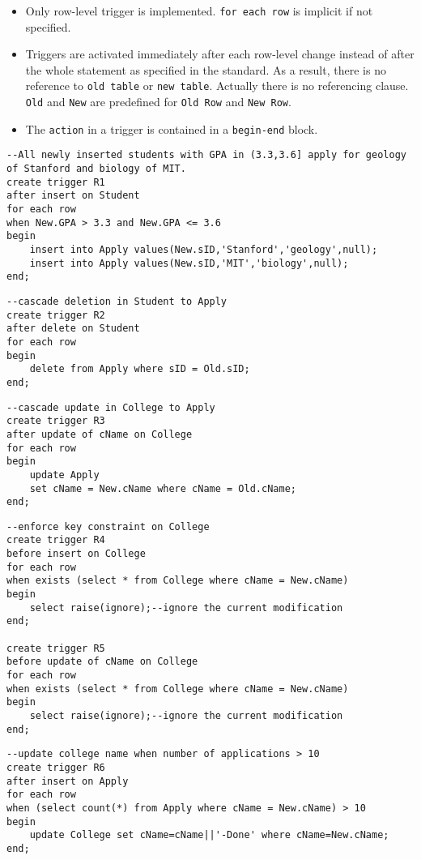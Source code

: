 \begin{itemize}
\item Only row-level trigger is implemented. \texttt{for each row} is implicit if not specified.
\item Triggers are activated immediately after each row-level change instead of after the whole statement as specified in the standard. As a result, there is no reference to \texttt{old table} or \texttt{new table}. Actually there is no referencing clause. \texttt{Old} and \texttt{New} are predefined for \texttt{Old Row} and \texttt{New Row}.
\item The \texttt{action} in a trigger is contained in a \texttt{begin-end} block.
\end{itemize}
\begin{lstlisting}
--All newly inserted students with GPA in (3.3,3.6] apply for geology of Stanford and biology of MIT.
create trigger R1
after insert on Student
for each row
when New.GPA > 3.3 and New.GPA <= 3.6
begin
	insert into Apply values(New.sID,'Stanford','geology',null);
	insert into Apply values(New.sID,'MIT','biology',null);
end;
\end{lstlisting}
\begin{lstlisting}
--cascade deletion in Student to Apply
create trigger R2
after delete on Student
for each row
begin
	delete from Apply where sID = Old.sID;
end;
\end{lstlisting}
\begin{lstlisting}
--cascade update in College to Apply
create trigger R3
after update of cName on College
for each row
begin
	update Apply
	set cName = New.cName where cName = Old.cName;
end;
\end{lstlisting}
\begin{lstlisting}
--enforce key constraint on College
create trigger R4
before insert on College
for each row 
when exists (select * from College where cName = New.cName)
begin
	select raise(ignore);--ignore the current modification
end;

create trigger R5
before update of cName on College
for each row 
when exists (select * from College where cName = New.cName)
begin
	select raise(ignore);--ignore the current modification
end;
\end{lstlisting}
\begin{lstlisting}
--update college name when number of applications > 10
create trigger R6
after insert on Apply
for each row
when (select count(*) from Apply where cName = New.cName) > 10
begin
	update College set cName=cName||'-Done' where cName=New.cName;
end;
\end{lstlisting}
